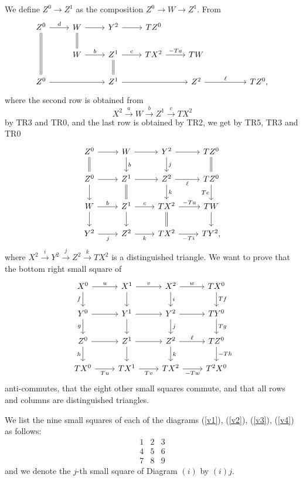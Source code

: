 \documentclass[12pt]{article}
\theoremstyle{remark}%
\begin{document}
%
We define $Z^0\to Z^1$ as the composition $Z^0\to W\to Z^1$. From 
$$
\begin{tikzcd}
Z^0\ar[equal]{dd}\ar{r}{d}&W\ar[equal]{d}\ar{r}&Y^2\ar{r}&TZ^0\\
&W\ar{r}{b}&Z^1\ar[equal]{d}\ar{r}{c}&TX^2\ar{r}{-Ta}&TW\\
Z^0\ar{rr}&&Z^1\ar{rr}&&Z^2\ar{rr}{\ell}&&TZ^0,
\end{tikzcd}
$$
where the second row is obtained from 
$$
X^2\overset{a}{\to}W\overset{b}{\to}Z^1\overset{c}{\to}TX^2
$$
by TR3 and TR0, and the last row is obtained by TR2, we get by TR5, TR3 and TR0
%
\begin{equation}\label{v3}
\begin{tikzcd}
Z^0\ar{r}\ar[equal]{d}&W\ar{d}{b}\ar{r}&Y^2\ar{d}{j}\ar{r}&TZ^0\ar[equal]{d}\\
Z^0\ar{d}\ar{r}&Z^1\ar{r}\ar[equal]{d}&Z^2\ar{d}{k}\ar{r}[swap]{\ell}&TZ^0\ar{d}[swap]{Te}\\
W\ar{d}\ar{r}{b}&Z^1\ar{d}\ar{r}{c}&TX^2\ar{r}{-Ta}\ar[equal]{d}&TW\ar{d}\\
Y^2\ar{r}[swap]{j}&Z^2\ar{r}[swap]{k}&TX^2\ar{r}[swap]{-Ti}&TY^2,
\end{tikzcd}
\end{equation}
%
where $X^2\overset{i}{\to}Y^2\overset{j}{\to}Z^2\overset{k}{\to}TX^2$ is a distinguished triangle. We want to prove that the bottom right small square of 
%
\begin{equation}\label{v4}
\begin{tikzcd}
X^0\ar{r}{u}\ar{d}[swap]{f}&X^1\ar{d}\ar{r}{v}&X^2\ar{d}{i}\ar{r}{w}&TX^0\ar{d}{Tf}\\ 
Y^0\ar{r}\ar{d}[swap]{g}&Y^1\ar{d}\ar{r}&Y^2\ar{d}{j}\ar{r}&TY^0\ar{d}{Tg}\\ 
Z^0\ar{r}\ar{d}[swap]{h}&Z^1\ar{d}\ar{r}&Z^2\ar{d}{k}\ar{r}{\ell}&TZ^0\ar{d}{-Th}\\ 
TX^0\ar{r}[swap]{Tu}&TX^1\ar{r}[swap]{Tv}&TX^2\ar{r}[swap]{-Tw}&T^2X^0
\end{tikzcd}
\end{equation}
%
anti-commutes, that the eight other small squares commute, and that all rows and columns are distinguished triangles.

We list the nine small squares of each of the diagrams (\ref{v1}), (\ref{v2}), (\ref{v3}), (\ref{v4}) as follows:
$$
\begin{matrix}1&2&3\\ 4&5&6\\ 7&8&9
\end{matrix}
$$ 
and we denote the $j$-th small square of Diagram $(i)$ by $(i)j$. 
\end{document}
